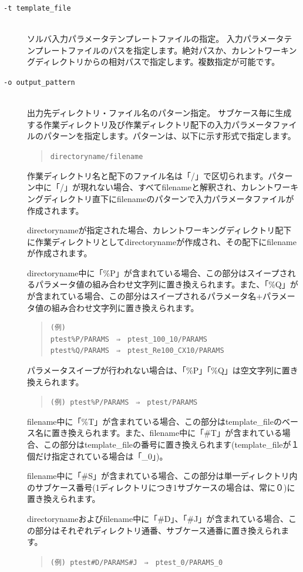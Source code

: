 \documentclass[a4paper,11pt]{jarticle}
\begin{document}
\begin{description}
\begin{description}
\item[{\tt -t  template\_file}] {\ }\\
ソルバ入力パラメータテンプレートファイルの指定。
入力パラメータテンプレートファイルのパスを指定します。絶対パスか、カレントワーキングディレクトリからの相対パスで指定します。複数指定が可能です。

\item[{\tt -o  output\_pattern}] {\ }\\
出力先ディレクトリ・ファイル名のパターン指定。
サブケース毎に生成する作業ディレクトリ及び作業ディレクトリ配下の入力パラメータファイルのパターンを指定します。パターンは、以下に示す形式で指定します。
\begin{quote}
{\tt directoryname/filename}
\end{quote}
作業ディレクトリ名と配下のファイル名は「/」で区切られます。パターン中に「/」が現れない場合、すべてfilenameと解釈され、カレントワーキングディレクトリ直下にfilenameのパターンで入力パラメータファイルが作成されます。

directorynameが指定された場合、カレントワーキングディレクトリ配下に作業ディレクトリとしてdirectorynameが作成され、その配下にfilenameが作成されます。

directoryname中に「\%P」が含まれている場合、この部分はスイープされるパラメータ値の組み合わせ文字列に置き換えられます。また、「\%Q」がが含まれている場合、この部分はスイープされるパラメータ名+パラメータ値の組み合わせ文字列に置き換えられます。
\begin{quote}
\begin{verbatim}
(例)
ptest%P/PARAMS　⇒　ptest_100_10/PARAMS
ptest%Q/PARAMS　⇒　ptest_Re100_CX10/PARAMS
\end{verbatim}
\end{quote}

パラメータスイープが行われない場合は、「\%P」「\%Q」は空文字列に置き換えられます。
\begin{quote}
{\tt (例) ptest\%P/PARAMS　⇒　ptest/PARAMS}
\end{quote}

filename中に「\%T」が含まれている場合、この部分はtemplate\_fileのベース名に置き換えられます。また、filename中に「\#T」が含まれている場合、この部分はtemplate\_fileの番号に置き換えられます(template\_fileが１個だけ指定されている場合は「\_0」)。

filename中に「\#S」が含まれている場合、この部分は単一ディレクトリ内のサブケース番号(1ディレクトリにつき1サブケースの場合は、常に０)に置き換えられます。

directorynameおよびfilename中に「\#D」、「\#J」が含まれている場合、この部分はそれぞれディレクトリ通番、サブケース通番に置き換えられます。
\begin{quote}
{\tt (例) ptest\#D/PARAMS\#J　⇒　ptest\_0/PARAMS\_0}
\end{quote}


\end{description}
\end{description}
\end{document}
